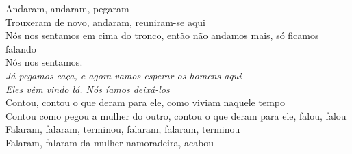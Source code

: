 \begin{linenumbers}\begingroup\raggedright
 
\noindent   Andaram, andaram, pegaram\\
  Trouxeram de novo, andaram, reuniram-se aqui\\
  Nós nos sentamos em cima do tronco, então não andamos mais, só ficamos falando\\
  Nós nos sentamos.\\
  \emph{Já pegamos caça, e agora vamos esperar os homens aqui}\\
  \emph{Eles vêm vindo lá. Nós íamos deixá-los}\\
  Contou, contou o que deram para ele, como viviam naquele tempo\\
  Contou como pegou a mulher do outro, contou o que deram para ele, falou, falou\\
  Falaram, falaram, terminou, falaram, falaram, terminou\\
  Falaram, falaram da mulher namoradeira, acabou
 
\end{linenumbers}\endgroup

\bigskip

